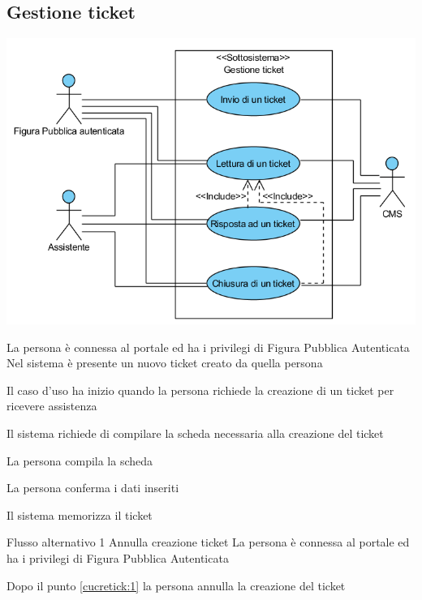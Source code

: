 \subsection{Gestione ticket}
\begin{center}
   \includegraphics[width=\textwidth]{assets/visualParadigm/cu/GestioneTicket}
\end{center}
{}
{La persona è connessa al portale ed ha i privilegi di Figura Pubblica Autenticata}
{Nel sistema è presente un nuovo ticket creato da quella persona}
{\begin{enumCU}
	\item Il caso d'uso ha inizio quando la persona richiede la creazione di un ticket per ricevere assistenza
	\item Il sistema richiede di compilare la scheda necessaria alla creazione del ticket
	\item La persona compila la scheda\label{cucretick:1}
	\item La persona conferma i dati inseriti
	\item Il sistema memorizza il ticket
\end{enumCU}}
%
{Flusso alternativo 1}%
{Annulla creazione ticket}%
{La persona è connessa al portale ed ha i privilegi di Figura Pubblica Autenticata}%
{\postNulle}%
{\begin{enumCU}
		\item Dopo il punto \ref{cucretick:1} la persona annulla la creazione del ticket
	\end{enumCU}}%

